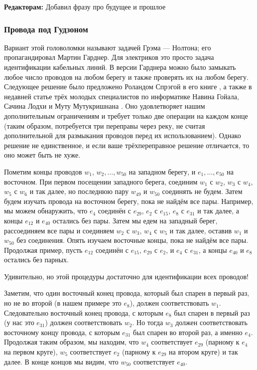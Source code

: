 \begin{addedbytheeditors}
\textbf{Редакторам:} Добавил фразу про будущее и прошлое
\end{addedbytheeditors}


\subsubsection*{Провода под Гудзоном}

Вариант этой головоломки называют задачей Грэма --- Нолтона;
его пропагандировал Мартин Гарднер.
Для электриков это просто задача идентификации кабельных линий.
В версии Гарднера можно было замыкать любое число проводов на любом берегу и также проверять их на любом берегу.
Следующее решение было предложено Роландом Спрэгой в его книге \cite{54}, а также в недавней статье трёх молодых специалистов по информатике Навина Гойала, Сачина Лодхи и Муту Мутукришнана \cite{33}.
Оно удовлетворяет нашим дополнительным ограничениям и требует только две операции на каждом конце (таким образом, потребуется три переправы через реку, не считая дополнительной для размыкания проводов перед их использованием).
Однако решение не единственное, и если ваше трёхпереправное решение отличается, то оно может быть не хуже.

Пометим концы проводов $w_1$, $w_2, \dots, w_{50}$ на западном берегу,
и $e_1, \dots, e_{50}$ на восточном. %
При первом посещении западного берега, соединим $w_1$ с $w_2$, $w_3$ с $w_4$, $w_5$ с $w_6$ и так далее, но последнюю пару $w_{49}$ и $w_{50}$ соединять не будем.
Затем будем изучать провода на восточном берегу, пока не найдём все пары.
Например, мы можем обнаружить, что $e_4$ соединён с $e_{29}$, $e_2$ с $e_{15}$, $e_8$ с $e_{31}$ и так далее, а концы $e_{12}$ и $e_{40}$ остались без пары.
Затем мы едем на западный берег, рассоединяем все пары и соединяем $w_2$ с $w_3$, $w_4$ с $w_5$ и так далее, оставив $w_1$ и $w_{50}$ без соединения.
Опять изучаем восточные концы, пока не найдём все пары.
Продолжая пример, пусть $e_{12}$ соединён с $e_{15}$, $e_{29}$ с $e_2$, и $e_4$ с $e_{31}$, а концы $e_{40}$ и $e_8$ остались без парных.

Удивительно, но этой процедуры достаточно для идентификации всех проводов!

Заметим, что один восточный конец провода, который был спарен в первый раз, но не во второй (в нашем примере это $e_8$), должен соответствовать $w_1$.
Следовательно восточный конец провода, с которым $e_8$ был спарен в первый раз (у нас это $e_{31}$) должен соответствовать $w_2$.
Но тогда $w_3$ должен соответствовать восточному концу провода, с которым $e_{31}$ был спарен во второй раз, а именно $e_4$.
Продолжая таким образом, мы находим, что $w_4$ соответствует $e_{29}$ (парному к $e_4$ на первом круге), $w_5$ соответствует $e_2$ (парному к $e_{29}$ на втором круге) и так далее.
В конце концов мы видим, что $w_{50}$ соответствует $e_{40}$.

